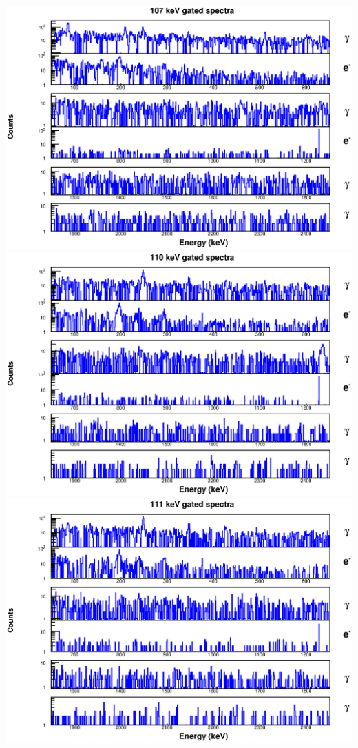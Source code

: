 \begin{landscape}
\includegraphics[scale=1.1]{154Gd_Appendix/107_combined.eps}
\includegraphics[scale=1.1]{154Gd_Appendix/110_combined.eps}
\includegraphics[scale=1.1]{154Gd_Appendix/111_combined.eps}

\end{landscape}
